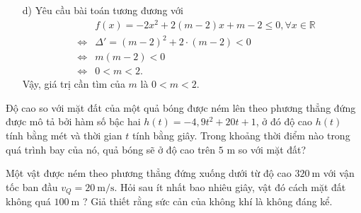 \begin{vd}
{\begin{itemize}
\begin{center}
			\end{center}
			Dựa vào bảng xét dấu ta thấy $m \in \left[ \dfrac{1}{2};1\right]$ thoả mãn yêu cầu bài toán.
			\item [d)] Yêu cầu bài toán tương đương với
			{\allowdisplaybreaks
				\begin{eqnarray*}
					&&f(x)=-2x^2+2(m-2)x+m-2\le 0,\forall x\in\mathbb{R} \\
					&\Leftrightarrow & \Delta' =(m-2)^2+2\cdot(m-2)< 0\\
					&\Leftrightarrow & m(m-2)< 0\\
					&\Leftrightarrow & 0< m< 2.
			\end{eqnarray*}}
			Vậy, giá trị cần tìm của $m$ là $0< m< 2$.
		\end{itemize}
	}
\end{vd}

\begin{vd}
	Độ cao so với mặt đất của một quả bóng được ném lên theo phương thẳng đứng được mô tả bởi hàm số bậc hai $h(t)=-4,9 t^{2}+20 t+1$, ở đó độ cao $h(t)$ tính bằng mét và thời gian $t$ tính bằng giây. Trong khoảng thời điểm nào trong quá trình bay của nó, quả bóng sẽ ở độ cao trên $5$ m so với mặt đất?
\end{vd}

\begin{vd}
	Một vật được ném theo phương thẳng đứng xuống dưới từ độ cao $320 \mathrm{~m}$ với vận tốc ban đầu $v_{Q}=20 \mathrm{~m} / \mathrm{s}$. Hỏi sau ít nhất bao nhiêu giây, vật đó cách mặt đất không quá $100 \mathrm{~m}$ ? Giả thiết rằng sức cản của không khí là không đáng kể.
\end{vd}

